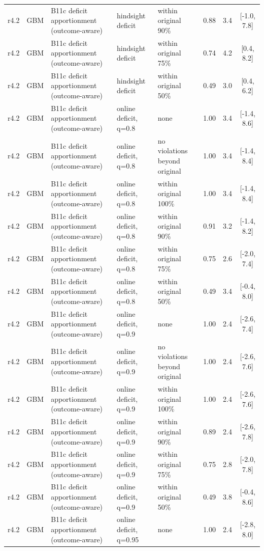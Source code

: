 \begin{longtable}{lllp{4.2cm}p{3.4cm}ccc}
r4.2 & GBM & B11c deficit apportionment (outcome-aware) & hindsight deficit & within original 90\% & 0.88 & 3.4 & [-1.0, 7.8] \\
r4.2 & GBM & B11c deficit apportionment (outcome-aware) & hindsight deficit & within original 75\% & 0.74 & 4.2 & [0.4, 8.2] \\
r4.2 & GBM & B11c deficit apportionment (outcome-aware) & hindsight deficit & within original 50\% & 0.49 & 3.0 & [0.4, 6.2] \\
r4.2 & GBM & B11c deficit apportionment (outcome-aware) & online deficit, q=0.8 & none & 1.00 & 3.4 & [-1.4, 8.6] \\
r4.2 & GBM & B11c deficit apportionment (outcome-aware) & online deficit, q=0.8 & no violations beyond original & 1.00 & 3.4 & [-1.4, 8.4] \\
r4.2 & GBM & B11c deficit apportionment (outcome-aware) & online deficit, q=0.8 & within original 100\% & 1.00 & 3.4 & [-1.4, 8.4] \\
r4.2 & GBM & B11c deficit apportionment (outcome-aware) & online deficit, q=0.8 & within original 90\% & 0.91 & 3.2 & [-1.4, 8.2] \\
r4.2 & GBM & B11c deficit apportionment (outcome-aware) & online deficit, q=0.8 & within original 75\% & 0.75 & 2.6 & [-2.0, 7.4] \\
r4.2 & GBM & B11c deficit apportionment (outcome-aware) & online deficit, q=0.8 & within original 50\% & 0.49 & 3.4 & [-0.4, 8.0] \\
r4.2 & GBM & B11c deficit apportionment (outcome-aware) & online deficit, q=0.9 & none & 1.00 & 2.4 & [-2.6, 7.4] \\
r4.2 & GBM & B11c deficit apportionment (outcome-aware) & online deficit, q=0.9 & no violations beyond original & 1.00 & 2.4 & [-2.6, 7.6] \\
r4.2 & GBM & B11c deficit apportionment (outcome-aware) & online deficit, q=0.9 & within original 100\% & 1.00 & 2.4 & [-2.6, 7.6] \\
r4.2 & GBM & B11c deficit apportionment (outcome-aware) & online deficit, q=0.9 & within original 90\% & 0.89 & 2.4 & [-2.6, 7.8] \\
r4.2 & GBM & B11c deficit apportionment (outcome-aware) & online deficit, q=0.9 & within original 75\% & 0.75 & 2.8 & [-2.0, 7.8] \\
r4.2 & GBM & B11c deficit apportionment (outcome-aware) & online deficit, q=0.9 & within original 50\% & 0.49 & 3.8 & [-0.4, 8.6] \\
r4.2 & GBM & B11c deficit apportionment (outcome-aware) & online deficit, q=0.95 & none & 1.00 & 2.4 & [-2.8, 8.0] \\

\end{longtable}
